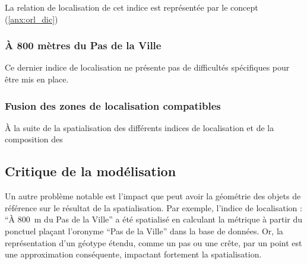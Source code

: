 La relation de localisation de cet indice est représentée par le
concept 
(\autoref{anx:orl_dic})

\subsubsection{À 800 mètres du Pas de la Ville}

Ce dernier indice de localisation ne présente pas de difficultés
spécifiques pour être mis en place.





\subsubsection{Fusion des zones de localisation compatibles}

À la suite de la spatialisation des différents indices de localisation
et de la composition des 

\subsection{Critique de la modélisation}
\label{subsec:9-2-3}


Un autre problème notable est l'impact que peut avoir la géométrie des
objets de référence sur le résultat de la spatialisation. Par exemple,
l'indice de localisation : \enquote{À \SI{800}{\meter} du Pas de la
  Ville} a été spatialisé en calculant la métrique
 à partir du ponctuel plaçant l'oronyme
\enquote{Pas de la Ville} dans la base de données. Or, la
représentation d'un géotype étendu, comme un pas ou une crête, par un
point est une approximation conséquente, impactant fortement la
spatialisation.


